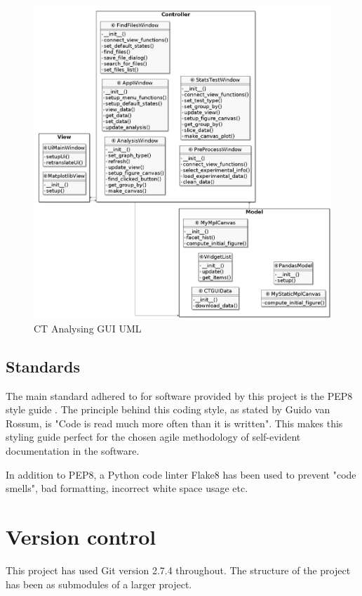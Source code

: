 \documentclass[11pt]{report}
\begin{document}
\begin{figure}[htbp]
\centering
\includegraphics[width=15.2cm]{./images/ctgui.png}
\caption{\label{fig:orge783e20}
CT Analysing GUI UML}
\end{figure}


\subsection{Standards}
\label{sec:orge25cccc}
The main standard adhered to for software provided by this project is the PEP8 style guide \cite{VanRossum}. The principle behind this coding style, as stated by Guido van Rossum, is "Code is read much more often than it is written". This makes this styling guide perfect for the chosen agile methodology of self-evident documentation in the software.

In addition to PEP8, a Python code linter Flake8 has been used to prevent "code smells", bad formatting, incorrect white space usage etc.

\section{Version control}
\label{sec:org991df07}
This project has used Git version 2.7.4 throughout. The structure of the project has been as submodules of a larger project.
\end{document}
